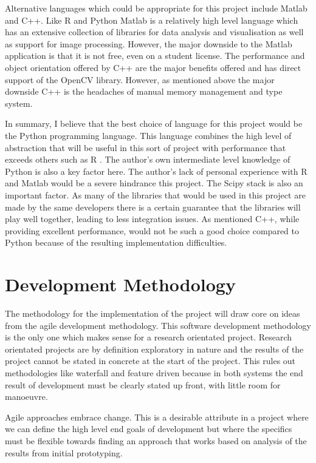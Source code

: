 Alternative languages which could be appropriate for this project include Matlab and C++. Like R and Python Matlab \cite{matlab} is a relatively high level language which has an extensive collection of libraries for data analysis and visualisation as well as support for image processing. However, the major downside to the Matlab application is that it is not free, even on a student license. The performance and object orientation offered by C++ are the major benefits offered and has direct support of the OpenCV library. However, as mentioned above the major downside C++ is the headaches of manual memory management and type system.

In summary, I believe that the best choice of language for this project would be the Python programming language. This language combines the high level of abstraction that will be useful in this sort of project with performance that exceeds others such as R \cite{morandat2012evaluating}. The author's own intermediate level knowledge of Python is also a key factor here. The author's lack of personal experience with R and Matlab would be a severe hindrance this project. The Scipy stack is also an important factor. As many of the libraries that would be used in this project are made by the same developers there is a certain guarantee that the libraries will play well together, leading to less integration issues. As mentioned C++, while providing excellent performance, would not be such a good choice compared to Python because of the resulting implementation difficulties.

\section{Development Methodology}
The methodology for the implementation of the project will draw core on ideas from the agile development methodology. This software development methodology is the only one which makes sense for a research orientated project. Research orientated projects are by definition exploratory in nature and the results of the project cannot be stated in concrete at the start of the project. This rules out methodologies like waterfall and feature driven because in both systems the end result of development must be clearly stated up front, with little room for manoeuvre.

Agile approaches embrace change. This is a desirable attribute in a project where we can define the high level end goals of development but where the specifics must be flexible towards finding an approach that works based on analysis of the results from initial prototyping.

